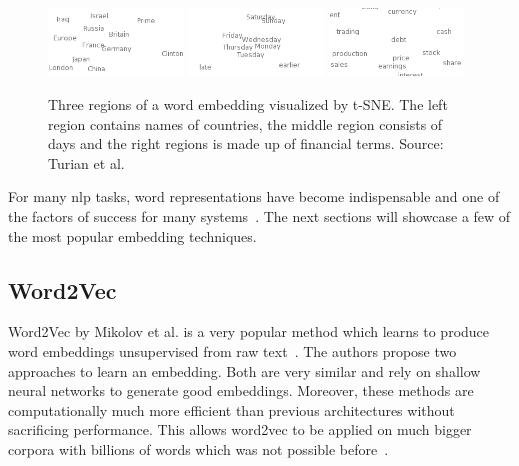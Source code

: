 \begin{figure}[ht]
	\centering
	\includegraphics[width=0.32\textwidth]{figures/03_theory/03_wordEmbeddings1}
	\includegraphics[width=0.32\textwidth]{figures/03_theory/03_wordEmbeddings2}
	\includegraphics[width=0.32\textwidth]{figures/03_theory/03_wordEmbeddings3}
	\caption[Three regions of a word embedding visualized by t-SNE. Source: Turian et al.~\cite{Turian2010} -- Source for full image \url{http://metaoptimize.s3.amazonaws.com/cw-embeddings-ACL2010/embeddings-mostcommon.EMBEDDING_SIZE=50.png}]{Three regions of a word embedding visualized by t-SNE. The left region contains names of countries, the middle region consists of days and the right regions is made up of financial terms. Source: Turian et al.~\cite{Turian2010}\protect\footnotemark}
	\label{fig:03_WordEmbeddings}
\end{figure}

For many \gls{nlp} tasks, word representations have become indispensable and one of the factors of success for many systems~\cite{Luong2013}. The next sections will showcase a few of the most popular embedding techniques.

\subsection{Word2Vec}
\label{sec:03_word2vec}

Word2Vec by Mikolov et al. is a very popular method which learns to produce word embeddings unsupervised from raw text~\cite{Mikolov2013}. The authors propose two approaches to learn an embedding. Both are very similar and rely on shallow neural networks to generate good embeddings. Moreover, these methods are computationally much more efficient than previous architectures without sacrificing performance. This allows word2vec to be applied on much bigger corpora with billions of words which was not possible before~\cite{Mikolov2013c}.


